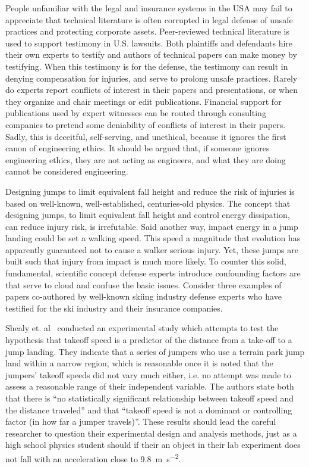 \documentclass{article}
\begin{document}
People unfamiliar with the legal and insurance systems in the USA
may fail to appreciate that technical literature is often corrupted in legal 
defense of unsafe practices and protecting corporate assets. Peer-reviewed technical
literature is used to support testimony in U.S. lawsuits. Both plaintiffs and
defendants hire their own experts to testify and authors of technical papers
can make money by testifying. When this testimony is for the defense, the testimony can
result in denying compensation for injuries, and serve to prolong unsafe
practices. Rarely do experts report conflicts of interest in
their papers and presentations, or when they organize and chair meetings or
edit publications. Financial support for publications used by expert witnesses
can be routed through consulting companies to pretend some deniability of
conflicts of interest in their papers. Sadly, this is deceitful, self-serving, and unethical, because it ignores the first canon of engineering ethics. It should be argued that, if someone ignores engineering ethics, they are not acting as engineers, and what they are doing cannot be considered engineering.

Designing jumps to limit equivalent fall height and reduce the risk of injuries
is based on well-known, well-established, centuries-old physics. The concept that designing
jumps, to limit equivalent fall height and control energy dissipation,
can reduce injury risk, is irrefutable. Said another way, impact energy
in a jump landing could be set a walking speed. This speed a magnitude that
evolution has apparently guaranteed not to cause a walker serious injury. Yet, these jumps are built such that
injury from impact is much more likely. To counter this solid, fundamental,
scientific concept defense experts introduce confounding factors are that serve to cloud and confuse the basic issues. Consider three examples of
papers co-authored by well-known skiing industry defense experts who have testified for the ski
industry and their insurance companies.

Shealy et. al~\cite{Shealy2010} conducted an experimental study which attempts
to test the hypothesis that takeoff speed is a predictor of the distance from a take-off to a jump landing. They indicate that a series of jumpers who use a terrain park jump
land within a narrow region, which is reasonable once it is noted that the
jumpers' takeoff speeds did not vary much either, i.e. no attempt was made to assess a
reasonable range of their independent variable. The authors state both that there
is ``no statistically significant relationship between takeoff speed and the
distance traveled'' and that ``takeoff speed is not a dominant or controlling
factor (in how far a jumper travels)''. These results should lead the careful
researcher to question their experimental design and analysis methods, just as
a high school physics student should if their an object in their lab experiment does not fall with an
acceleration close to 9.8~\si{\meter\per\second\squared}.
\end{document}
